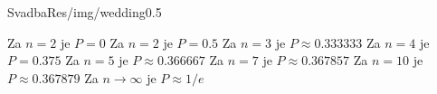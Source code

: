 \documentclass{beamer}
\begin{document}
    \begin{framebg}{Svadba}{Res/img/wedding}{0.5}
        \pause
        \begin{itemize}
            \itemR Za $n=2$  je $P = 0$ \pause
            \itemR Za $n=2$  je $P = 0.5$ \pause
            \itemR Za $n=3$  je $P \approx 0.333333$ \pause
            \itemR Za $n=4$  je $P = 0.375$ \pause
            \itemR Za $n=5$  je $P \approx 0.366667$ \pause
            \itemR Za $n=7$  je $P \approx 0.367857$ \pause
            \itemR Za $n=10$ je $P \approx 0.367879$ \pause
            \itemR Za $n \to \infty$ je $P \approx 1/e$
        \end{itemize}
    \end{framebg}
\end{document}
